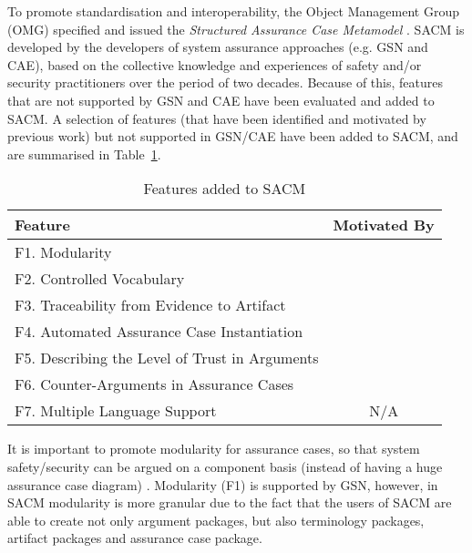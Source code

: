 To promote standardisation and interoperability, the Object Management Group (OMG) specified and issued the \textit{Structured Assurance Case Metamodel} \cite{sacm}. 
SACM is developed by the developers of system assurance approaches (e.g. GSN and CAE), based on the collective knowledge and experiences of safety and/or security practitioners over the period of two decades. 
Because of this, features that are not supported by GSN and CAE have been evaluated and added to SACM. 
A selection of features (that have been identified and motivated by previous work) but not supported in GSN/CAE have been added to SACM, and are summarised in Table~\ref{tab:feature}.

\begin{table}[]
	\centering
	\begin{tabular}{|l|l|}
		\hline
		\textbf{Feature}               & \multicolumn{1}{c|}{\textbf{Motivated By}}                        \\ \hline
		F1. Modularity            & \multicolumn{1}{c|}{\cite{despotou2008investigating}} \\ \hline
		F2. Controlled Vocabulary &\multicolumn{1}{c|}{\cite{luo2015safety, attwood2014use}}                  \\ \hline
		F3. Traceability from Evidence to Artifact &\multicolumn{1}{c|}{\cite{taguchi2014linking}}                  \\ \hline
		F4. Automated Assurance Case Instantiation &\multicolumn{1}{c|}{\cite{hawkins2015need, hawkins2015weaving}}                  \\ \hline
		F5. Describing the Level of Trust in Arguments &\multicolumn{1}{c|}{\cite{fenn2005putting}}                  \\ \hline
		F6. Counter-Arguments in Assurance Cases &\multicolumn{1}{c|}{\cite{armstrong2004deconstruction}}                  \\ \hline
		F7. Multiple Language Support &\multicolumn{1}{c|}{N/A}                  \\ \hline
	\end{tabular}
	\caption{Features added to SACM}
	\label{tab:feature}
\end{table}

It is important to promote modularity for assurance cases, so that system safety/security can be argued on a component basis (instead of having a huge assurance case diagram) \cite{despotou2008investigating}. 
Modularity (F1) is supported by GSN, however, in SACM modularity is more granular due to the fact that the users of SACM are able to create not only argument packages, but also terminology packages, artifact packages and assurance case package.

